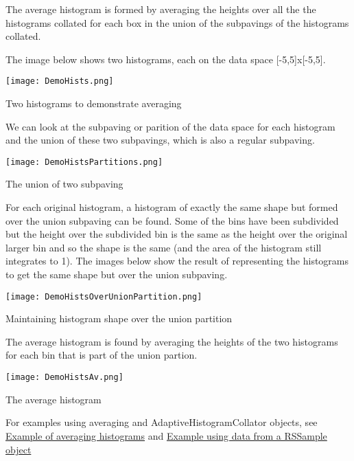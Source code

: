 \-The average histogram is formed by averaging the heights over all the the histograms collated for each box in the union of the subpavings of the histograms collated.

\-The image below shows two histograms, each on the data space \mbox{[}-\/5,5\mbox{]}x\mbox{[}-\/5,5\mbox{]}.

 
\begin{DoxyImage}
\texttt{[image: DemoHists.png]}
\caption{\-Two histograms to demonstrate averaging}
\end{DoxyImage}


\-We can look at the subpaving or parition of the data space for each histogram and the union of these two subpavings, which is also a regular subpaving.

 
\begin{DoxyImage}
\texttt{[image: DemoHistsPartitions.png]}
\caption{\-The union of two subpaving}
\end{DoxyImage}


\-For each original histogram, a histogram of exactly the same shape but formed over the union subpaving can be found. \-Some of the bins have been subdivided but the height over the subdivided bin is the same as the height over the original larger bin and so the shape is the same (and the area of the histogram still integrates to 1). \-The images below show the result of representing the histograms to get the same shape but over the union subpaving.

 
\begin{DoxyImage}
\texttt{[image: DemoHistsOverUnionPartition.png]}
\caption{\-Maintaining histogram shape over the union partition}
\end{DoxyImage}


\-The average histogram is found by averaging the heights of the two histograms for each bin that is part of the union partion.

 
\begin{DoxyImage}
\texttt{[image: DemoHistsAv.png]}
\caption{\-The average histogram}
\end{DoxyImage}


\-For examples using averaging and \-Adaptive\-Histogram\-Collator objects, see \hyperlink{AdaptiveHistograms_adhsubsec_examaveraging}{\-Example of averaging histograms} and \hyperlink{AdaptiveHistograms_adhsubsec_examLevy}{\-Example using data from a \-R\-S\-Sample object}



